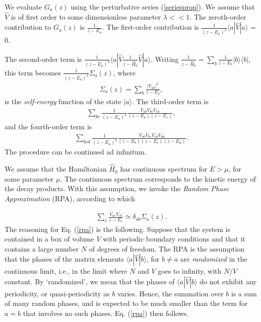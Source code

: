 \documentclass[12pt]{article}
\numberwithin{equation}{section}
\begin{document}
 We evaluate $G_a(z)$ using the perturbative series (\ref{seriesprop}). We assume that $\hat{V}$ is of first order to  some  dimensionless parameter $\lambda << 1$.  The zeroth-order contribution to $G_a(z)$ is
  $ \frac{1}{z - E_a}$. The first-order contribution is
 $ \frac{1}{(z - E_a)^2} \langle a|\hat{V}|a\rangle$ = 0.

 The second-order term is  $ \frac{1}{(z - E_a)^2} \langle a|\hat{V} \frac{1}{z - \hat{H}_0} \hat{V}|a\rangle$. Writing $ \frac{1}{z - \hat{H}_0} =  \sum_b \frac{1}{z - E_b} |b\rangle \langle b|$, this term becomes $ \frac{1}{(z - E_a)^2} \Sigma_a(z) $, where
\begin{eqnarray}
\Sigma_a(z) = \sum_b \frac{|V_{ab}|^2}{z - E_b}, \label{sigmaa}
\end{eqnarray}
is the {\em self-energy} function of the state $|a\rangle$.
 The third-order term is
 \begin{eqnarray}
\sum_{bc} \frac{1}{(z-E_a)^2} \frac{ V_{ab} V_{bc} V_{ca}}{(z-E_b)(z-E_c)}, \nonumber
\end{eqnarray}
and the fourth-order term is
\begin{eqnarray}
\sum_{bcd} \frac{1}{(z-E_a)^2} \frac{ V_{ab} V_{bc} V_{cd}V_{da}}{(z-E_b)(z-E_c)(z-E_d)}. \nonumber
\end{eqnarray}
 The procedure can be continued ad infinitum.

We assume that the Hamiltonian $\hat{H}_0$ has continuous spectrum for $E > \mu$, for some parameter $\mu$. The continuous spectrum corresponds to the kinetic energy of the decay products. With this assumption, we invoke the   {\em Random Phase Approximation} (RPA), according to which

\begin{eqnarray}
\sum_c \frac{V_{ac}V_{cb}}{z-E_c} \simeq \delta_{ab} \Sigma_a(z). \label{rpa}
\end{eqnarray}
The reasoning for Eq. (\ref{rpa}) is the following. Suppose that the system is contained in a box of volume $V$ with periodic boundary conditions and that it contains a large number $N$ of degrees of freedom. The RPA is the assumption that the phases of the matrix elements $\langle a| \hat{V}|b\rangle$, for $b \neq a$ are {\em randomized} in the continuous limit, i.e., in the limit where $N$ and $V$ goes to infinity, with $N/V$ constant. By `randomized', we mean that the phases of $\langle a| \hat{V}|b\rangle$ do not exhibit any periodicity, or quasi-periodicity as $b$ varies. Hence, the summation over $b$ is a sum of many random phases, and is expected to be much smaller than the term for $a = b$ that involves no such phases. Eq. (\ref{rpa}) then follows.
\end{document}
